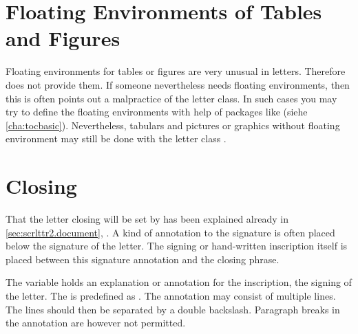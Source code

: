 \section{Floating Environments of Tables and Figures}
\label{sec:scrlttr2.floats}

Floating environments for tables or figures are very unusual in
letters. Therefore  does not provide
them. If someone nevertheless needs floating environments, then this is often
points out a malpractice of the letter class. In such cases you may try to
define the floating environments with help of packages like  (siehe
\autoref{cha:tocbasic}). Nevertheless, tabulars and pictures or graphics
without floating environment may still be done with the letter class
.




\section{Closing}
\label{sec:scrlttr2.closing}
%
%
%
%

That the letter closing will be set by  has
been explained already in \autoref{sec:scrlttr2.document},
. A kind of annotation to the signature
is often placed below the signature of the letter. The signing or hand-written
inscription itself is placed between this signature annotation and the closing
phrase.

\begin{Declaration}
\end{Declaration}
%
The variable  holds an explanation or annotation for the
inscription, the signing of the letter. The  is predefined as
.  The annotation may consist
of multiple lines. The lines should then be separated by a double
backslash. Paragraph breaks in the annotation are however
not permitted.%

